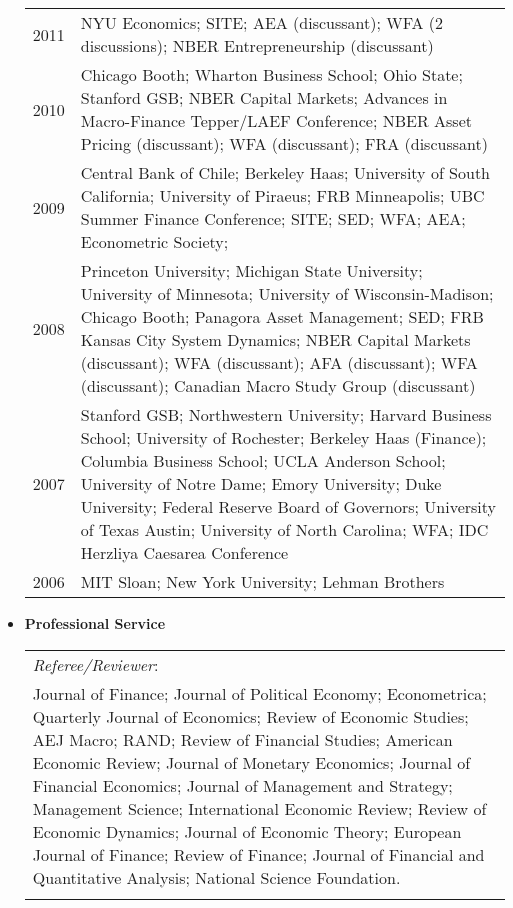 \documentclass[11pt,letterpaper,serif,overlapped]{res}
\begin{document}
\begin{resume}
\begin{itemize}
\begin{longtable}{lp{15cm}}
2011 & NYU Economics;  SITE; AEA (discussant); WFA (2 discussions); NBER Entrepreneurship (discussant) \\[0.1cm]
2010 & Chicago Booth; Wharton Business School; Ohio State; Stanford GSB; NBER Capital Markets; Advances in Macro-Finance Tepper/LAEF Conference; NBER Asset Pricing (discussant); WFA (discussant); FRA (discussant)  \\[0.1cm]
2009 & Central Bank of Chile; Berkeley Haas; University of South California;   University of Piraeus; FRB Minneapolis;  UBC Summer Finance Conference; SITE;   SED; WFA; AEA; Econometric Society;\\[0.1cm]
2008 & Princeton University; Michigan State University; University of Minnesota;    University of Wisconsin-Madison; Chicago Booth; Panagora Asset Management; SED;   FRB Kansas City System Dynamics; NBER Capital Markets (discussant); WFA (discussant); AFA (discussant); WFA (discussant); Canadian Macro Study Group (discussant)\\[0.1cm]
2007 & Stanford GSB; Northwestern University; Harvard Business School;   University of Rochester; Berkeley Haas (Finance); Columbia Business School;  UCLA Anderson School; University of Notre Dame;    Emory University; Duke University; Federal Reserve Board of Governors;  University of Texas Austin; University of North Carolina;   WFA; IDC Herzliya Caesarea Conference\\[0.1cm]
2006 & MIT Sloan; New York University; Lehman Brothers\\
\end{longtable}

\vspace{0.5cm}


\item \textbf{Professional Service} \\





 \begin{tabular}{p{16cm}}
 \emph{Referee/Reviewer}:\\
Journal of Finance; Journal of Political Economy; Econometrica; Quarterly Journal of Economics; Review of Economic Studies; AEJ Macro; RAND;  Review of Financial Studies; American Economic Review;  Journal of Monetary Economics; Journal of Financial Economics; Journal of Management and Strategy; Management Science;  International Economic Review; Review of Economic Dynamics;   Journal of Economic Theory;   European Journal of Finance;   Review of Finance; Journal of Financial and Quantitative Analysis; National Science Foundation.\\\\
 \end{tabular}






\end{itemize}
\end{resume}
\end{document}
